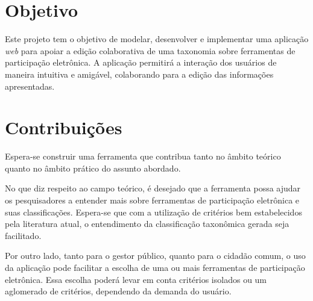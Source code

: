 \section{Objetivo}
\label{sec:objetivo}
Este projeto tem o objetivo de modelar, desenvolver e implementar uma aplicação \textit{web} para apoiar a edição colaborativa de uma taxonomia sobre ferramentas
de participação eletrônica. A aplicação permitirá a interação dos usuários de maneira intuitiva e amigável, colaborando para a edição das informações apresentadas.

\section{Contribuições}
\label{sec:contribuicoes}
Espera-se construir uma ferramenta que contribua tanto no âmbito teórico quanto no âmbito prático do assunto abordado. 
\par
No que diz respeito ao campo teórico, é desejado que a ferramenta possa ajudar os pesquisadores a entender mais sobre ferramentas de participação eletrônica e suas classificações. 
Espera-se que com a utilização de critérios bem estabelecidos pela literatura atual, o entendimento da classificação taxonômica gerada seja facilitado.
\par
Por outro lado, tanto para o gestor público, quanto para o cidadão comum, o uso da aplicação pode facilitar a escolha de uma ou mais ferramentas de participação
eletrônica. Essa escolha poderá levar em conta critérios isolados ou um aglomerado de critérios, dependendo da demanda do usuário.

